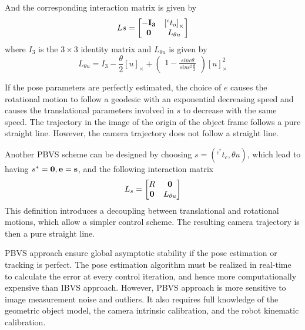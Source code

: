 And the corresponding interaction matrix is given by
\begin{equation}
  Ls = \begin{bmatrix}
    -\bf{I}_3 & {[^{c}t_o]}_{\times}\\
    \bf{0} & L_{\theta u}
  \end{bmatrix}
\label{eq:servo7}
\end{equation}
where $I_3$ is the $3 \times 3$ identity matrix and $L_{\theta u}$ is given by
\begin{equation}
  L_{\theta u} = I_3 - \frac{\theta}{2}{[u]}_{\times} + \begin{pmatrix} 1 - \frac{sinc \theta}{sinc^2 \frac{\theta}{2}}\end{pmatrix}{[u]}_{\times}^{2}
\label{eq:servo8}
\end{equation}

If the pose parameters are perfectly estimated, the choice of $e$ causes the rotational motion to follow a geodesic with an exponential decreasing speed and causes the translational parameters involved in $s$ to decrease with the same speed. The trajectory in the image of the origin of the object frame follows a pure straight line. However, the camera trajectory does not follow a straight line.

Another PBVS scheme can be designed by choosing $s = (^{c^*}t_c,\theta u)$, which lead to having $s^* = \bf{0}, e = s$, and the following interaction matrix
\begin{equation}
  L_s = \begin{bmatrix}
    R & \bf{0}\\
    \bf{0} & L_{\theta u}
  \end{bmatrix}
\label{eq:servo9}
\end{equation}
This definition introduces a decoupling between translational and rotational motions, which allow a simpler control scheme. The resulting camera trajectory is then a pure straight line.

PBVS approach ensure global asymptotic stability if the pose estimation or tracking is perfect. The pose estimation algorithm must be realized in real-time to calculate the error at every control iteration, and hence more computationally expensive than IBVS approach. However, PBVS approach is more sensitive to image measurement noise and outliers. It also requires full knowledge of the geometric object model, the camera intrinsic calibration, and the robot kinematic calibration.
